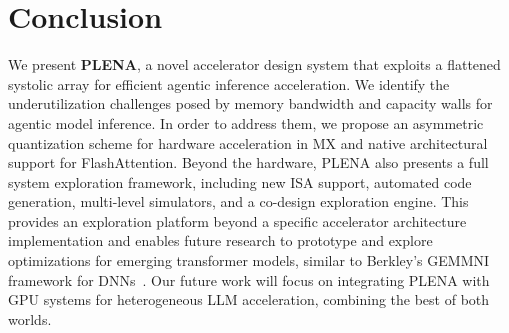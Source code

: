 
\section{Conclusion}

We present \textbf{PLENA}, a novel accelerator design system that exploits a flattened systolic array for efficient agentic inference acceleration.
We identify the underutilization challenges posed by memory bandwidth and capacity walls for agentic model inference.
In order to address them, we propose an asymmetric quantization scheme for hardware acceleration in MX and native architectural support for FlashAttention.
Beyond the hardware, PLENA also presents a full system exploration framework, including new ISA support, automated code generation, multi-level simulators, and a co-design exploration engine.
This provides an exploration platform beyond a specific accelerator architecture implementation and enables future research to prototype and explore optimizations for emerging transformer models, similar to Berkley's GEMMNI framework for DNNs~\cite{gemmini-dac}.
Our future work will focus on integrating PLENA with GPU systems for heterogeneous LLM acceleration, combining the best of both worlds. 

